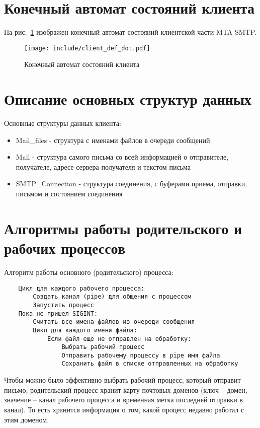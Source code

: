 \documentclass[a4paper,12pt]{report}
\begin{document}
\section{Конечный автомат состояний клиента}

На рис.~\ref{fig:fsm} изображен конечный автомат состояний клиентской части MTA SMTP. 

\begin{figure}[h]
    \centering
    \texttt{[image: include/client\_def\_dot.pdf]}
    \caption{Конечный автомат состояний клиента}
    \label{fig:fsm}
\end{figure}

\section{Описание основных структур данных}

 Основные структуры данных клиента:
\begin{itemize}
    \item Mail\_files - структура с именами файлов в очереди сообщений
    \item Mail - структура самого письма со всей информацией о отправителе, получателе, адресе сервера получателя и текстом письма
    \item SMTP\_Connection - структура соединения, с буферами приема, отправки, письмом и состоянием соединения
\end{itemize}

\section{Алгоритмы работы родительского и рабочих процессов}

Алгоритм работы основного (родительского) процесса:

\begin{verbatim}
    Цикл для каждого рабочего процесса:
        Создать канал (pipe) для общения с процессом
        Запустить процесс
    Пока не пришел SIGINT:
        Считать все имена файлов из очереди сообщения
        Цикл для каждого имени файла:
            Если файл еще не отправлен на обработку:
                Выбрать рабочий процесс
                Отправить рабочему процессу в pipe имя файла
                Сохранить файл в списке отправленных на обработку
\end{verbatim}

Чтобы можно было эффективно выбрать рабочий процесс, который отправит письмо, родительский процесс хранит карту почтовых доменов (ключ -- домен, значение -- канал рабочего процесса и временная метка последней отправки в канал). То есть хранится информация о том, какой процесс недавно работал с этим доменом.
\end{document}
